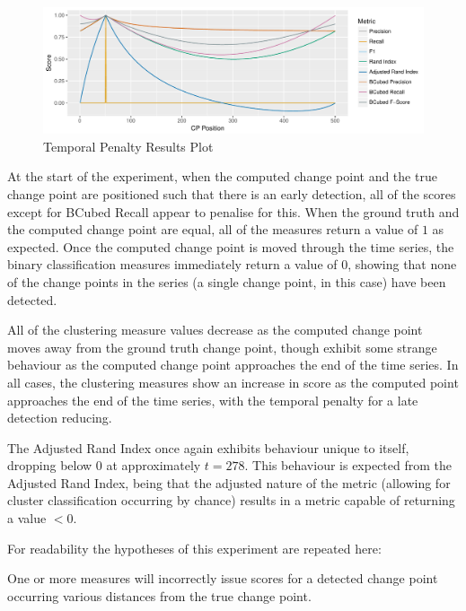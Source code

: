 \documentclass[../main.tex]{subfiles}
\begin{document}
\begin{figure}[h]
    \includegraphics[width=\textwidth]{figures/Experiment3}
    \caption{Temporal Penalty Results Plot}
    \label{fig:Experiment4}
\end{figure}

At the start of the experiment, when the computed change point and the true change point are positioned such that there is an early detection, all of the scores except for BCubed Recall appear to penalise for this. When the ground truth and the computed change point are equal, all of the measures return a value of $1$ as expected. Once the computed change point is moved through the time series, the binary classification measures immediately return a value of $0$, showing that none of the change points in the series (a single change point, in this case) have been detected.

All of the clustering measure values decrease as the computed change point moves away from the ground truth change point, though exhibit some strange behaviour as the computed change point approaches the end of the time series. In all cases, the clustering measures show an increase in score as the computed point approaches the end of the time series, with the temporal penalty for a late detection reducing.

The Adjusted Rand Index once again exhibits behaviour unique to itself, dropping below $0$ at approximately $t=278$. This behaviour is expected from the Adjusted Rand Index, being that the adjusted nature of the metric (allowing for cluster classification occurring by chance) results in a metric capable of returning a value $<0$.

\pagebreak

For readability the hypotheses of this experiment are repeated here:

\begin{hypothesis*}
    One or more measures will incorrectly issue scores for a detected change point occurring various distances from the true change point.
\end{hypothesis*}
\end{document}
